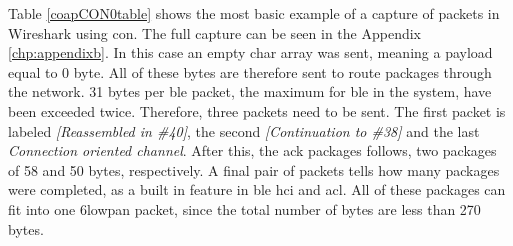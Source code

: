 \noindent Table \ref{coapCON0table} shows the most basic example of a capture of packets in Wireshark using \gls{con}. The full capture can be seen in the Appendix \ref{chp:appendixb}. In this case an empty char array was sent, meaning a \gls{payload} equal to 0 byte. All of these bytes are therefore sent to route packages through the network. 31 bytes per \gls{ble} packet, the maximum for \gls{ble} in the system, have been exceeded twice. Therefore, three packets need to be sent. The first packet is labeled \textit{[Reassembled in \#40]}, the second \textit{[Continuation to \#38]} and the last \textit{Connection oriented channel}. After this, the \gls{ack} packages follows, two packages of 58 and 50 bytes, respectively. A final pair of packets tells how many packages were completed, as a built in feature in \gls{ble}  \gls{hci}  and \gls{acl}. All of these packages can fit into one \gls{6lowpan} packet, since the total number of bytes are less than 270 bytes. 



